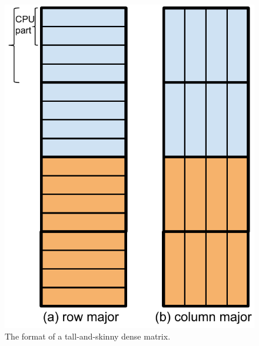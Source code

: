 \begin{figure}
	\centering
	\includegraphics[scale=0.5]{FlashMatrix_figs/dense_matrix2.pdf}
	\caption{The format of a tall-and-skinny dense matrix.}
	\label{fig:tas_mat}
\end{figure}

